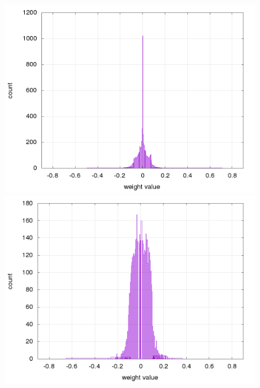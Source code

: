 \documentclass[10pt,a4paper]{article}
\begin{document}
\begin{figure}[!htb]
\centering
\begin{minipage}{.5\textwidth}
  \centering
  \includegraphics[scale=0.32]{../../results/rl_arcade/fnn_trained_0/supervised/layer_1_histogram.png}
\end{minipage}%
\begin{minipage}{.5\textwidth}
  \centering
  \includegraphics[scale=0.32]{../../results/rl_arcade/fnn_trained_5/supervised/layer_1_histogram.png}
\end{minipage}
\end{figure}
\end{document}
